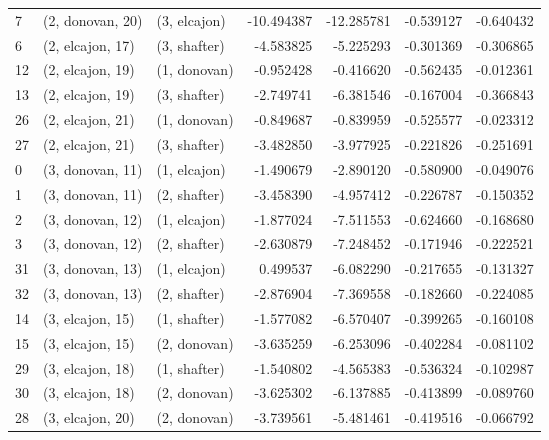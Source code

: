 \begin{tabular}{lllrrrr}
7  &  (2, donovan, 20) &     (3, elcajon) & -10.494387 & -12.285781 &  -0.539127 & -0.640432 \\
6  &  (2, elcajon, 17) &     (3, shafter) &  -4.583825 &  -5.225293 &  -0.301369 & -0.306865 \\
12 &  (2, elcajon, 19) &     (1, donovan) &  -0.952428 &  -0.416620 &  -0.562435 & -0.012361 \\
13 &  (2, elcajon, 19) &     (3, shafter) &  -2.749741 &  -6.381546 &  -0.167004 & -0.366843 \\
26 &  (2, elcajon, 21) &     (1, donovan) &  -0.849687 &  -0.839959 &  -0.525577 & -0.023312 \\
27 &  (2, elcajon, 21) &     (3, shafter) &  -3.482850 &  -3.977925 &  -0.221826 & -0.251691 \\
0  &  (3, donovan, 11) &     (1, elcajon) &  -1.490679 &  -2.890120 &  -0.580900 & -0.049076 \\
1  &  (3, donovan, 11) &     (2, shafter) &  -3.458390 &  -4.957412 &  -0.226787 & -0.150352 \\
2  &  (3, donovan, 12) &     (1, elcajon) &  -1.877024 &  -7.511553 &  -0.624660 & -0.168680 \\
3  &  (3, donovan, 12) &     (2, shafter) &  -2.630879 &  -7.248452 &  -0.171946 & -0.222521 \\
31 &  (3, donovan, 13) &     (1, elcajon) &   0.499537 &  -6.082290 &  -0.217655 & -0.131327 \\
32 &  (3, donovan, 13) &     (2, shafter) &  -2.876904 &  -7.369558 &  -0.182660 & -0.224085 \\
14 &  (3, elcajon, 15) &     (1, shafter) &  -1.577082 &  -6.570407 &  -0.399265 & -0.160108 \\
15 &  (3, elcajon, 15) &     (2, donovan) &  -3.635259 &  -6.253096 &  -0.402284 & -0.081102 \\
29 &  (3, elcajon, 18) &     (1, shafter) &  -1.540802 &  -4.565383 &  -0.536324 & -0.102987 \\
30 &  (3, elcajon, 18) &     (2, donovan) &  -3.625302 &  -6.137885 &  -0.413899 & -0.089760 \\
28 &  (3, elcajon, 20) &     (2, donovan) &  -3.739561 &  -5.481461 &  -0.419516 & -0.066792 \\
\bottomrule
\end{tabular}
